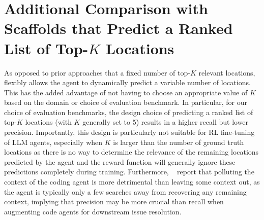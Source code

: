 \section{Additional Comparison with Scaffolds that Predict a Ranked List of Top-$K$ Locations}\label{appendix:topk_discussion}
As opposed to prior approaches that a fixed number of top-$K$ relevant locations, \methodname flexibly allows the agent to dynamically predict a variable number of locations. This has the added advantage of not having to choose an appropriate value of $K$ based on the domain or choice of evaluation benchmark. In particular, for our choice of evaluation benchmarks, the design choice of predicting a ranked list of top-$K$ locations (with $K$ generally set to 5) results in a higher recall but lower precision. Importantly, this design is particularly not suitable for RL fine-tuning of LLM agents, especially when $K$ is larger than the number of ground truth locations as there is no way to determine the relevance of the remaining locations predicted by the agent and the reward function will generally ignore these predictions completely during training. Furthermore, ~\citet{cognition2025swegrep} report that polluting the context of the coding agent is more detrimental than leaving some context out, as the agent is typically only a few searches away from recovering any remaining context, implying that precision may be more crucial than recall when augmenting code agents for downstream issue resolution.

